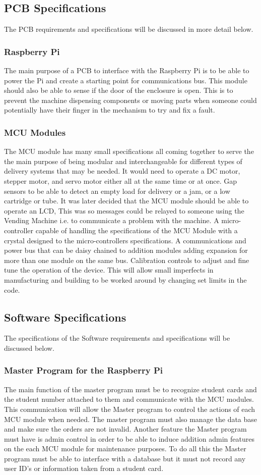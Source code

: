 \documentclass[a4paper,11pt]{article}
\numberwithin{figure}{section}
\numberwithin{table}{section}
\begin{document}
\subsection{PCB Specifications}
The PCB requirements and specifications will be discussed in more detail below.
\subsubsection{Raspberry Pi}
The main purpose of a PCB to interface with the Raspberry Pi is to be able to power the Pi and create a starting point for communications bus. This module should also be able to sense if the door of the enclosure is open. This is to prevent the machine dispensing components or moving parts when someone could potentially have their finger in the mechanism to try and fix a fault. 
\subsubsection{MCU Modules}
The MCU module has many small specifications all coming together to serve the the main purpose of being modular and interchangeable for different types of delivery systems that may be needed. It would need to operate a DC motor, stepper motor, and servo motor either all at the same time or at once. Gap sensors to be able to detect an empty load for delivery or a jam, or a low cartridge or tube. It was later decided that the MCU module should be able to operate an LCD, This was so messages could be relayed to someone using the Vending Machine i.e. to communicate a problem with the machine. A micro-controller capable of handling the specifications of the MCU Module with a crystal designed to the micro-controllers specifications. A communications and power bus that can be daisy chained to addition modules adding expansion for more than one module on the same bus. Calibration controls to adjust and fine tune the operation of the device. This will allow small imperfects in manufacturing and building to be worked around by changing set limits in the code.
\subsection{Software Specifications}
The specifications of the Software requirements and specifications will be discussed below.
\subsubsection{Master Program for the Raspberry Pi}
The main function of the master program must be to recognize student cards and the student number attached to them and communicate with the MCU modules. This communication will allow the Master program to control the actions of each MCU module when needed. The master program must also manage the data base and make sure the orders are not invalid. Another feature the Master program must have is admin control in order to be able to induce addition admin features on the each MCU module for maintenance purposes. To do all this the Master program must be able to interface with a database but it must not record any user ID's or information taken from a student card.
\end{document}
